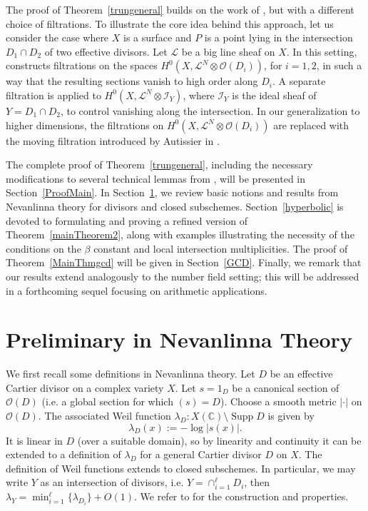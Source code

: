 \documentclass[10pt]{amsart}
\numberwithin{equation}{section}
\theoremstyle{plain}
\theoremstyle{definition}
\DeclareMathOperator{\Supp}{Supp}
\begin{document}
The proof of Theorem~\ref{trungeneral} builds on the work of \cite{HLX}, but with a different choice of filtrations.  To illustrate the core idea behind this approach, let us consider the case where \( X \) is a surface and \( P \) is a point lying in the intersection \( D_1 \cap D_2 \) of two effective divisors. Let \( \mathcal{L} \) be a big line sheaf on \( X \). In this setting, \cite{HLX} constructs filtrations on the spaces \( H^0(X, \mathcal{L}^N \otimes \mathcal{O}(D_i)) \), for \( i = 1, 2 \), in such a way that the resulting sections vanish to high order along \( D_i \). A separate filtration is applied to \( H^0(X, \mathcal{L}^N \otimes {\mathscr I}_{Y}) \), where \( {\mathscr I}_{Y} \) is the ideal sheaf of \( Y = D_1 \cap D_2 \), to control vanishing along the intersection.
In our generalization to higher dimensions, the filtrations on  \( H^0(X, \mathcal{L}^N \otimes \mathcal{O}(D_i)) \) are replaced with the moving filtration introduced by Autissier in \cite{Aut11}. 

The complete proof of Theorem~\ref{trungeneral}, including the necessary modifications to several technical lemmas from \cite{HLX}, will be presented in Section~\ref{ProofMain}. In Section~\ref{Nevanlinna}, we review basic notions and results from Nevanlinna theory for divisors and closed subschemes. Section~\ref{hyperbolic} is devoted to formulating and proving a refined version of Theorem~\ref{mainTheorem2}, along with examples illustrating the necessity of the conditions on the $\beta$ constant and local intersection multiplicities.  The proof of Theorem~\ref{MainThmgcd} will be given in Section~\ref{GCD}.  Finally, we remark that our results extend analogously to the number field setting; this will be addressed in a forthcoming sequel focusing on arithmetic applications.  


 \section{Preliminary in Nevanlinna Theory}\label{Nevanlinna} 
  We first recall some definitions in Nevanlinna theory.
  Let $D$ be an effective Cartier divisor on a complex variety $X$.  Let  $s=1_D$ be a canonical section of $\mathscr O(D)$ (i.e. a global section for which $(s)=D$).  Choose a smooth metric $|\cdot|$
on $\mathscr O(D)$.  The associated Weil function $ \lambda_D: X(\mathbb C)\setminus\Supp D$ is given by
\begin{equation*} 
  \lambda_D(x) := -\log|s(x)|.
\end{equation*}
It is linear in $D$ (over a suitable domain), so by linearity and continuity
it can be extended to a definition of $\lambda_D$ for a general Cartier divisor
$D$ on $X$.  The definition of Weil functions extends to closed subschemes.  In particular, we may write $Y$ as an intersection of divisors, i.e. $Y=\cap_{i=1}^{\ell} D_i$, then $\lambda_Y=\min_{i=1}^{\ell}\{\lambda_{D_i}\} +O(1).$   We refer to \cite{Yamanoi} for the construction and properties. 
\end{document}
